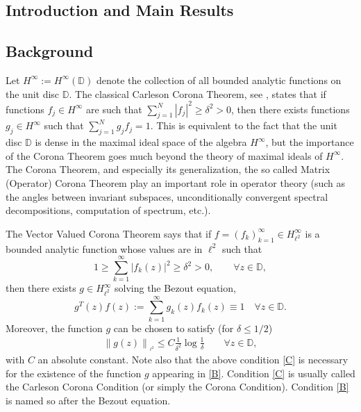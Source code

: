 \documentclass[12pt]{amsart}
\begin{document}
{\begin{list}{X}
{\section{Introduction and Main Results}

\subsection{Background}
Let $H^\infty:=H^\infty\left({\mathbb{D}}\right)$ denote the collection of all bounded analytic functions on the unit disc ${\mathbb{D}}$.  The classical Carleson Corona Theorem, see \cite{Carl}, states that 
if functions
\(f_{j}\in H^{\infty}\) are such that
\(\sum_{j=1}^{N}{\ensuremath{\left\vert{f_{j}}\right\vert}}^{2}\geq\delta^2>0\), then  there exists
functions $g_{j}\in H^{\infty}$ such that
$\sum_{j=1}^{N}g_{j}f_{j}=1$.   This is equivalent to the fact that the unit disc ${\mathbb{D}}$ is dense in the
maximal ideal space of the algebra $H^\infty$, but the importance of 
the
Corona Theorem goes much beyond the theory of maximal ideals of
$H^\infty$.  The Corona Theorem, and especially its generalization, the so called
Matrix (Operator) Corona Theorem play an important role in 
operator
theory (such as the angles between invariant subspaces, unconditionally convergent
spectral decompositions, computation of spectrum, etc.). 

The Vector Valued Corona Theorem says that if  $f=(f_k)_{k=1}^\infty\in H^\infty_{\ell^2}$ is a bounded 
analytic function whose values are in $\ell^2$ such that 
\begin{equation}
\label{C}
\tag{C}
1\ge \sum_{k=1}^\infty {\ensuremath{\left\vert{f_k(z)}\right\vert}}^2\ge\delta^2  >0, \qquad \forall z\in{\mathbb{D}}, 
\end{equation}
then there exists $g\in H^\infty_{\ell^2}$ solving the Bezout equation, 
\begin{equation}
\label{B}
\tag{B}
g^T(z)f(z):=\sum_{k=1}^\infty g_k(z) f_k(z)\equiv 1\quad\forall z\in{\mathbb{D}}.
\end{equation}
Moreover, the function $g$ can be chosen to satisfy (for  $\delta\le1/2$)
\begin{align}
\label{CorEst-01}
\|g(z)\|{_{ {}_{\scriptstyle {\ell^2}}}} \le C\frac{1}{\delta^2}\log\frac1{\delta} \qquad \forall z\in {\mathbb{D}},
\end{align}
with $C$ an absolute constant.  Note also that the above condition \eqref{C} is necessary for the existence of the function $g$ appearing in \eqref{B}.  Condition \eqref{C} is usually called the  Carleson Corona Condition (or simply the Corona Condition).  Condition \eqref{B} is named so after the Bezout equation. 

}
\end{list}}
\end{document}
